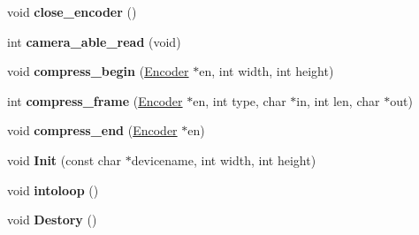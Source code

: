 \begin{DoxyCompactItemize}
void {\bfseries close\+\_\+encoder} ()
\item 
\mbox{\label{class_device_a559094bf6961e9eba3712dc8591edca8}} 
int {\bfseries camera\+\_\+able\+\_\+read} (void)
\item 
\mbox{\label{class_device_aaac3f374b03d0f56f280351d5f4465b4}} 
void {\bfseries compress\+\_\+begin} (\hyperlink{struct_encoder}{Encoder} $\ast$en, int width, int height)
\item 
\mbox{\label{class_device_a6fbc13710308c3801e72a90ec3967a03}} 
int {\bfseries compress\+\_\+frame} (\hyperlink{struct_encoder}{Encoder} $\ast$en, int type, char $\ast$in, int len, char $\ast$out)
\item 
\mbox{\label{class_device_a811c381a9def366464189533b2a82130}} 
void {\bfseries compress\+\_\+end} (\hyperlink{struct_encoder}{Encoder} $\ast$en)
\item 
\mbox{\label{class_device_a5a7aa55079fe5793415fbfc390de7c26}} 
void {\bfseries Init} (const char $\ast$devicename, int width, int height)
\item 
\mbox{\label{class_device_a81e1f0d8a92771c4855d2831cfad77cc}} 
void {\bfseries intoloop} ()
\item 
\mbox{\label{class_device_a86bcc50a18a2ce9af12e97a7febb1651}} 
void {\bfseries Destory} ()
\end{DoxyCompactItemize}
